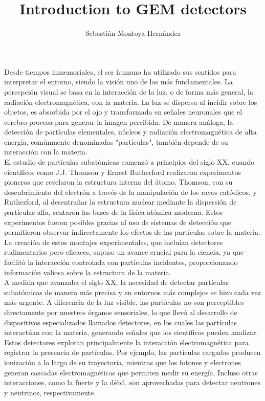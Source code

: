 \documentclass{article}
\title{\textbf{Introduction to GEM detectors}}
\author{Sebastián Montoya Hernández}
\begin{document}
\maketitle 
\setcounter{section}{0}

\noindent Desde tiempos inmemoriales, el ser humano ha utilizado sus sentidos para interpretar el entorno, siendo la visión uno de los más fundamentales. La percepción visual se basa en la interacción de la luz, o de forma más general, la radiación electromagnética, con la materia. La luz se dispersa al incidir sobre los objetos, es absorbida por el ojo y transformada en señales neuronales que el cerebro procesa para generar la imagen percibida. De manera análoga, la detección de partículas elementales, núcleos y radiación electromagnética de alta energía, comúnmente denominadas "partículas", también depende de su interacción con la materia. \\

\noindent El estudio de partículas subatómicas comenzó a principios del siglo XX, cuando científicos como J.J. Thomson y Ernest Rutherford realizaron experimentos pioneros que revelaron la estructura interna del átomo. Thomson, con su descubrimiento del electrón a través de la manipulación de los rayos catódicos, y Rutherford, al desentrañar la estructura nuclear mediante la dispersión de partículas alfa, sentaron las bases de la física atómica moderna. Estos experimentos fueron posibles gracias al uso de sistemas de detección que permitieron observar indirectamente los efectos de las partículas sobre la materia. La creación de estos montajes experimentales, que incluían detectores rudimentarios pero eficaces, supuso un avance crucial para la ciencia, ya que facilitó la interacción controlada con partículas incidentes, proporcionando información valiosa sobre la estructura de la materia. \\

\noindent A medida que avanzaba el siglo XX, la necesidad de detectar partículas subatómicas de manera más precisa y en entornos más complejos se hizo cada vez más urgente. A diferencia de la luz visible, las partículas no son perceptibles directamente por nuestros órganos sensoriales, lo que llevó al desarrollo de dispositivos especializados llamados detectores, en los cuales las partículas interactúan con la materia, generando señales que los científicos pueden analizar. Estos detectores explotan principalmente la interacción electromagnética para registrar la presencia de partículas. Por ejemplo, las partículas cargadas producen ionización a lo largo de su trayectoria, mientras que los fotones y electrones generan cascadas electromagnéticas que permiten medir su energía. Incluso otras interacciones, como la fuerte y la débil, son aprovechadas para detectar neutrones y neutrinos, respectivamente. \\
\end{document}
